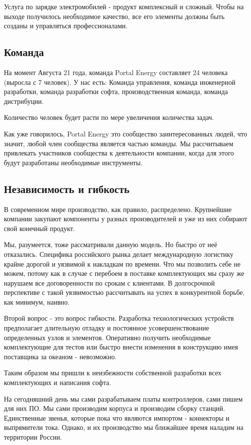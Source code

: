 \documentclass[a4paper,12pt]{report}
\begin{document}
Услуга по зарядке электромобилей - продукт комплексный и сложный. Чтобы на выходе получилось необходимое качество, все его элементы должны быть созданы и управляться профессионалами. 


\subsection{Команда}

На момент Августа 21 года, команда Portal Energy составляет 24 человека (выросла с 7 человек). У нас есть:
Команда управления, 
команда инженерной разработки, 
команда разработки софта, 
производственная команда,
команда дистрибуции. 

Количество человек будет расти по мере увеличения количества задач. 

Как уже говорилось, Portal Energy это сообщество заинтересованных людей, что значит, любой член сообщества является частью команды. Мы рассчитываем привлекать участников сообщества к деятельности компании, когда для этого будут разработаны необходимые инструменты.

\subsection{Независимость и гибкость}

В современном мире производство, как правило, распределено. Крупнейшие компании закупают компоненты у разных производителей и уже из них собирают свой конечный продукт. 

Мы, разумеется, тоже рассматривали данную модель. Но быстро от неё отказались. Специфика российского рынка делает международную логистику крайне дорогой и уязвимой к накладкам по времени. Что мы позволить себе не можем, потому как в случае с перебоем в поставке комплектующих мы сразу же нарушаем все договоренности по срокам с клиентами. В долгосрочной перспективе с такой уязвимостью рассчитывать на успех в конкурентной борьбе, как минимум, наивно. 

Второй вопрос - это вопрос гибкости. Разработка технологических устройств предполагает длительную отладку и постоянное усовершенствование определенных узлов и элементов. Оперативно получить необходимые комплектующие для тестов или быстро внести изменения в конструкцию имея поставщика за океаном - невозможно.

Таким образом мы пришли к неизбежности собственной разработки всех комплектующих и написания софта. 

На сегодняшний день мы сами разрабатываем платы контроллеров, сами пишем для них ПО. Мы сами производим корпуса и производим сборку станций. Единственные звенья, которые пока что являются импортом - коннекторы и выпрямители тока. Однако, и их производство мы ближайшее время наладим на территории России. 
\end{document}
